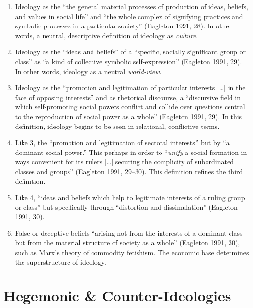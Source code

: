 \documentclass[10pt,british,A4paper,oneside]{memoir}
\providecommand{\tightlist}{%
  \setlength{\itemsep}{0pt}\setlength{\parskip}{0pt}}
\begin{document}
\begin{enumerate}
\def\labelenumi{\arabic{enumi}.}
\tightlist
\item
  Ideology as the ``the general material processes of production of
  ideas, beliefs, and values in social life'' and ``the whole complex of
  signifying practices and symbolic processes in a particular society''
  (Eagleton \protect\hyperlink{ref-eagleton_ideology:_1991}{1991}, 28).
  In other words, a neutral, descriptive definition of ideology as
  \emph{culture}.
\item
  Ideology as the ``ideas and beliefs'' of a ``specific, socially
  significant group or class'' as ``a kind of collective symbolic
  self-expression'' (Eagleton
  \protect\hyperlink{ref-eagleton_ideology:_1991}{1991}, 29). In other
  words, ideology as a neutral \emph{world-view}.
\item
  Ideology as the ``promotion and legitimation of particular interests
  {[}\ldots{}{]} in the face of opposing interests'' and as rhetorical
  discourse, a ``discursive field in which self-promoting social powers
  conflict and collide over questions central to the reproduction of
  social power as a whole'' (Eagleton
  \protect\hyperlink{ref-eagleton_ideology:_1991}{1991}, 29). In this
  definition, ideology begins to be seen in relational, conflictive
  terms.
\item
  Like 3, the ``promotion and legitimation of sectoral interests'' but
  by ``a dominant social power.'' This perhaps in order to
  ``\emph{unify} a social formation in ways convenient for its rulers
  {[}\ldots{}{]} securing the complicity of subordinated classes and
  groups'' (Eagleton
  \protect\hyperlink{ref-eagleton_ideology:_1991}{1991}, 29--30). This
  definition refines the third definition.
\item
  Like 4, ``ideas and beliefs which help to legitimate interests of a
  ruling group or class'' but specifically through ``distortion and
  dissimulation'' (Eagleton
  \protect\hyperlink{ref-eagleton_ideology:_1991}{1991}, 30).
\item
  False or deceptive beliefs ``arising not from the interests of a
  dominant class but from the material structure of society as a whole''
  (Eagleton \protect\hyperlink{ref-eagleton_ideology:_1991}{1991}, 30),
  such as Marx's theory of commodity fetishism. The economic base
  determines the superstructure of ideology.
\end{enumerate}

\section{Hegemonic \&
Counter-Ideologies}\label{hegemonic-counter-ideologies}
\end{document}
